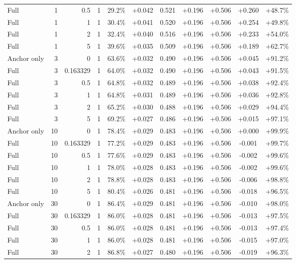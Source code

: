 \begin{table}[htbp]
\begin{tabular}{lrrrccccccc}
Full & 1 & 0.5 & 1 & 29.2\% & +0.042 & 0.521 & +0.196 & +0.506 & +0.260 & +48.7\% \\
Full & 1 & 1 & 1 & 30.4\% & +0.041 & 0.520 & +0.196 & +0.506 & +0.254 & +49.8\% \\
Full & 1 & 2 & 1 & 32.4\% & +0.040 & 0.516 & +0.196 & +0.506 & +0.233 & +54.0\% \\
Full & 1 & 5 & 1 & 39.6\% & +0.035 & 0.509 & +0.196 & +0.506 & +0.189 & +62.7\% \\
Anchor only & 3 & 0 & 1 & 63.6\% & +0.032 & 0.490 & +0.196 & +0.506 & +0.045 & +91.2\% \\
Full & 3 & 0.163329 & 1 & 64.0\% & +0.032 & 0.490 & +0.196 & +0.506 & +0.043 & +91.5\% \\
Full & 3 & 0.5 & 1 & 64.8\% & +0.032 & 0.489 & +0.196 & +0.506 & +0.038 & +92.4\% \\
Full & 3 & 1 & 1 & 64.8\% & +0.031 & 0.489 & +0.196 & +0.506 & +0.036 & +92.8\% \\
Full & 3 & 2 & 1 & 65.2\% & +0.030 & 0.488 & +0.196 & +0.506 & +0.029 & +94.4\% \\
Full & 3 & 5 & 1 & 69.2\% & +0.027 & 0.486 & +0.196 & +0.506 & +0.015 & +97.1\% \\
Anchor only & 10 & 0 & 1 & 78.4\% & +0.029 & 0.483 & +0.196 & +0.506 & +0.000 & +99.9\% \\
Full & 10 & 0.163329 & 1 & 77.2\% & +0.029 & 0.483 & +0.196 & +0.506 & -0.001 & +99.7\% \\
Full & 10 & 0.5 & 1 & 77.6\% & +0.029 & 0.483 & +0.196 & +0.506 & -0.002 & +99.6\% \\
Full & 10 & 1 & 1 & 78.0\% & +0.028 & 0.483 & +0.196 & +0.506 & -0.002 & +99.6\% \\
Full & 10 & 2 & 1 & 78.8\% & +0.028 & 0.483 & +0.196 & +0.506 & -0.006 & +98.8\% \\
Full & 10 & 5 & 1 & 80.4\% & +0.026 & 0.481 & +0.196 & +0.506 & -0.018 & +96.5\% \\
Anchor only & 30 & 0 & 1 & 86.4\% & +0.029 & 0.481 & +0.196 & +0.506 & -0.010 & +98.0\% \\
Full & 30 & 0.163329 & 1 & 86.0\% & +0.028 & 0.481 & +0.196 & +0.506 & -0.013 & +97.5\% \\
Full & 30 & 0.5 & 1 & 86.0\% & +0.028 & 0.481 & +0.196 & +0.506 & -0.013 & +97.4\% \\
Full & 30 & 1 & 1 & 86.0\% & +0.028 & 0.481 & +0.196 & +0.506 & -0.015 & +97.0\% \\
Full & 30 & 2 & 1 & 86.8\% & +0.027 & 0.480 & +0.196 & +0.506 & -0.019 & +96.3\% \\

\end{tabular}
\end{table}
